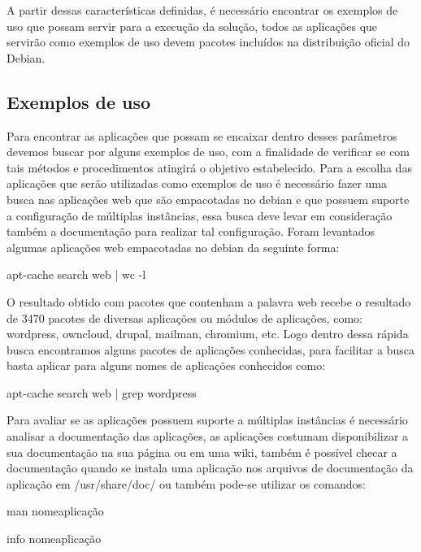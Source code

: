 A partir dessas características definidas, é necessário encontrar os exemplos de uso
que possam servir para a execução da solução, todos as aplicações que servirão como
exemplos de uso devem pacotes incluídos na distribuição oficial do Debian.

\subsection{Exemplos de uso}
\label{subsection:exemplos}

Para encontrar as aplicações que possam se encaixar dentro desses parâmetros devemos buscar por alguns exemplos de uso, com a finalidade de verificar se com tais métodos e
procedimentos atingirá o objetivo estabelecido. Para a escolha das aplicações que
serão utilizadas como exemplos de uso é necessário fazer uma busca nas aplicações
web que são empacotadas no debian e que possuem suporte a configuração de múltiplas
instâncias, essa busca deve levar em consideração também a documentação para realizar
tal configuração. Foram levantados algumas aplicações web empacotadas no debian da
seguinte forma:

\begin{center}
apt-cache search web | wc -l
\end{center}

O resultado obtido com pacotes que contenham a palavra web recebe o resultado de 3470
pacotes de diversas aplicações ou módulos de aplicações, como:
wordpress, owncloud, drupal, mailman, chromium, etc. Logo dentro dessa rápida busca
encontramos alguns pacotes de aplicações conhecidas, para facilitar a busca basta
aplicar para alguns nomes de aplicações conhecidos como:

\begin{center}
apt-cache search web | grep wordpress
\end{center}

Para avaliar se as aplicações possuem suporte a múltiplas instâncias é necessário
analisar a documentação das aplicações, as aplicações costumam disponibilizar a sua
documentação na sua página ou em uma wiki, também é possível checar a documentação
quando se instala uma aplicação nos arquivos de documentação da aplicação em
/usr/share/doc/ ou também pode-se utilizar os comandos:

\begin{center}
man nomeaplicação

info nomeaplicação
\end{center}

